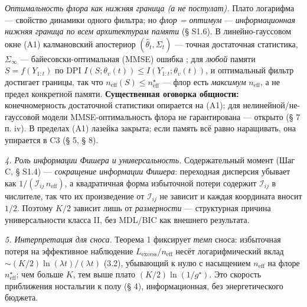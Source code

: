 \documentclass[12pt]{iopart}
\begin{document}
\emph{Оптимальность флора как нижняя граница (а не постулат).} Плато логарифма --- свойство динамики одного фильтра; но \emph{флор = оптимум} --- \emph{информационная нижняя граница по всем архитектурам памяти} (§ S1.6). В линейно-гауссовом окне (A1) калмановский апостериор \((\hat\theta_t,\Sigma_t)\) --- точная достаточная статистика, \(\Sigma_\infty\) --- байесовски-оптимальная (MMSE) ошибка \cite{AndersonMoore1979,KalmanBucy1961}; для \emph{любой} памяти \(S = f(Y_{1:t})\) по DPI \(I(S;\theta_v(t)) \le I(Y_{1:t};\theta_v(t))\), и оптимальный фильтр достигает границы, так что \(n_{\text{eff}}(S) \le n_{\text{eff}}^\star\) --- флор есть \emph{максимум} \(n_{\text{eff}}\), а не предел конкретной памяти. \textbf{Существенная оговорка общности:} конечномерность достаточной статистики опирается на (A1); для нелинейной/не-гауссовой модели MMSE-оптимальность флора не гарантирована --- открыто (§ 7 п. iv). В пределах (A1) лазейка закрыта; если память всё равно наращивать, она упирается в C3 (§ 5, § 8).



\emph{4. Роль информации Фишера и универсальность.} Содержательный момент (Шаг C, § S1.4) --- \emph{сокращение информации Фишера}: переходная дисперсия убывает как \(1/(\mathcal I_{ij}\,n_{\text{eff}})\), а квадратичная форма избыточной потери содержит \(\mathcal I_{ij}\) в числителе, так что их произведение от \(\mathcal I_{ij}\) не зависит и каждая координата вносит \(1/2\). Поэтому \(K/2\) зависит лишь от \emph{размерности} --- структурная причина универсальности класса II, без MDL/BIC как внешнего результата.



\emph{5. Интерпретация для сноса.} Теорема 1 фиксирует \emph{темп} сноса: избыточная потеря на эффективное наблюдение \(L_{\text{excess}}/n_{\text{eff}}\) несёт логарифмический вклад \(\sim (K/2)\ln(\lambda t)/(\lambda t)\) (3.2), убывающий к нулю с насыщением \(n_{\text{eff}}\) на флоре \(n_{\text{eff}}^\star\); чем больше \(K\), тем выше плато \((K/2)\ln(1/g^\star)\). Это скорость приближения ностальгии к полу (§ 4), информационная, без энергетического бюджета.
\end{document}
